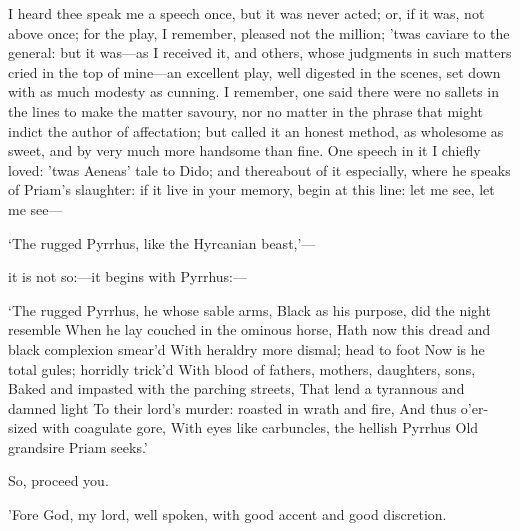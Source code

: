 \documentclass[11pt]{book}
\begin{document}
\1	I heard thee speak me a speech once, but it was
	never acted; or, if it was, not above once; for the
	play, I remember, pleased not the million; 'twas
	caviare to the general: but it was---as I received
	it, and others, whose judgments in such matters
	cried in the top of mine---an excellent play, well
	digested in the scenes, set down with as much
	modesty as cunning. I remember, one said there
	were no sallets in the lines to make the matter
	savoury, nor no matter in the phrase that might
	indict the author of affectation; but called it an
	honest method, as wholesome as sweet, and by very
	much more handsome than fine. One speech in it I
	chiefly loved: 'twas Aeneas' tale to Dido; and
	thereabout of it especially, where he speaks of
	Priam's slaughter: if it live in your memory, begin
	at this line: let me see, let me see---
\begin{Versus}
   \Locus \textus {+2em}
	`The rugged Pyrrhus, like the Hyrcanian beast,'---
\end{Versus}
	it is not so:---it begins with Pyrrhus:---
\begin{Versus}
   \Locus \textus {+2em}
	`The rugged Pyrrhus, he whose sable arms,
	Black as his purpose, did the night resemble
	When he lay couched in the ominous horse,
	Hath now this dread and black complexion smear'd
	With heraldry more dismal; head to foot
	Now is he total gules; horridly trick'd
	With blood of fathers, mothers, daughters, sons,
	Baked and impasted with the parching streets,
	That lend a tyrannous and damned light
	To their lord's murder: roasted in wrath and fire,
	And thus o'er-sized with coagulate gore,
	With eyes like carbuncles, the hellish Pyrrhus
	Old grandsire Priam seeks.'\\
\end{Versus}
	So, proceed you.

\5	'Fore God, my lord, well spoken, with good accent and
	good discretion.
\end{document}
